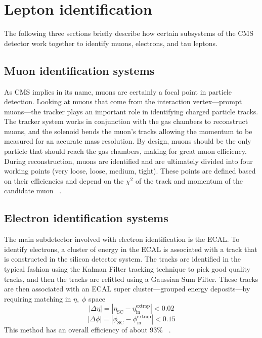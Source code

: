 
\section{Lepton identification}
The following three sections briefly describe how certain subsystems of the CMS detector work together to identify muons, electrons, and tau leptons. 

\subsection{Muon identification systems}

As CMS implies in its name, muons are certainly a focal point in particle detection. 
Looking at muons that come from the interaction vertex---prompt muons---the tracker plays an important role in identifying charged particle tracks. 
The tracker system works in conjunction with the gas chambers to reconstruct muons, and the solenoid bends the muon's tracks allowing the momentum to be measured for an accurate mass resolution. By design, muons should be the only particle that should reach the gas chambers, making for great muon efficiency. 
During reconstruction, muons are identified and are ultimately divided into four working points (very loose, loose, medium, tight). These points are defined based on their efficiencies and depend on the $\chi^2$ of the track and momentum of the candidate muon ~\cite{CMS-PAS-PFT-09-001,Kratschmer:1956760}.


\subsection{Electron identification systems}
The main subdetector involved with electron identification is the ECAL. To identify electrons, a cluster of energy in the ECAL is associated with a track that is constructed in the silicon detector system. 
The tracks are identified in the typical fashion using the Kalman Filter tracking technique to pick good quality tracks, and then the tracks are refitted using a Gaussian Sum Filter. 
These tracks are then associated with an ECAL super cluster---grouped energy deposits---by requiring matching in $\eta,\;\phi$ space
\begin{equation}|\Delta\eta| = |\eta_{\text{SC}} - \eta_{\text{in}}^{\text{extrap}}| < 0.02\end{equation}
\begin{equation}|\Delta\phi| = |\phi_{\text{SC}} - \phi_{\text{in}}^{\text{extrap}}| < 0.15\end{equation}
This method has an overall efficiency of about 93\% ~\cite{Khachatryan:2015hwa}. 

